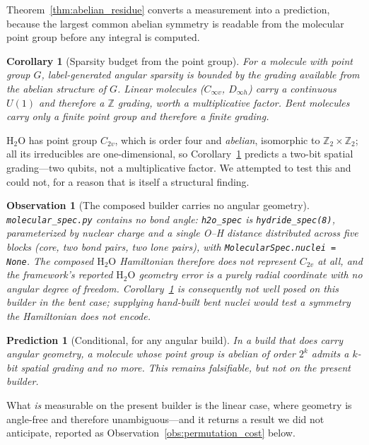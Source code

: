\documentclass[aps,pra,twocolumn,superscriptaddress,longbibliography]{revtex4-2}
\newtheorem{corollary}{Corollary}
\newtheorem{prediction}{Prediction}
\newtheorem{observation}{Observation}
\begin{document}
Theorem~\ref{thm:abelian_residue} converts a measurement into a
prediction, because the largest common abelian symmetry is readable from
the molecular point group before any integral is computed.

\begin{corollary}[Sparsity budget from the point group]
\label{cor:point_group}
For a molecule with point group $G$, label-generated angular sparsity is
bounded by the grading available from the abelian structure of $G$.
Linear molecules ($C_{\infty v}$, $D_{\infty h}$) carry a continuous
$U(1)$ and therefore a $\mathbb{Z}$ grading, worth a multiplicative
factor.  Bent molecules carry only a finite point group and therefore a
finite grading.
\end{corollary}

$\mathrm{H_2O}$ has point group $C_{2v}$, which is order four and
\emph{abelian}, isomorphic to $\mathbb{Z}_2 \times \mathbb{Z}_2$; all its
irreducibles are one-dimensional, so Corollary~\ref{cor:point_group}
predicts a two-bit spatial grading---two qubits, not a multiplicative
factor.  We attempted to test this and could not, for a reason that is
itself a structural finding.

\begin{observation}[The composed builder carries no angular geometry]
\label{obs:no_angle}
\texttt{molecular\_spec.py} contains no bond angle: \texttt{h2o\_spec} is
\texttt{hydride\_spec(8)}, parameterized by nuclear charge and a
\emph{single} O--H distance distributed across five blocks (core, two
bond pairs, two lone pairs), with \texttt{MolecularSpec.nuclei = None}.
The composed $\mathrm{H_2O}$ Hamiltonian therefore does not represent
$C_{2v}$ at all, and the framework's reported $\mathrm{H_2O}$ geometry
error is a purely radial coordinate with no angular degree of freedom.
Corollary~\ref{cor:point_group} is consequently \emph{not well posed} on
this builder in the bent case; supplying hand-built bent nuclei would
test a symmetry the Hamiltonian does not encode.
\end{observation}

\begin{prediction}[Conditional, for any angular build]
\label{pred:angular}
In a build that does carry angular geometry, a molecule whose point group
is abelian of order $2^k$ admits a $k$-bit spatial grading and no more.
This remains falsifiable, but not on the present builder.
\end{prediction}

What \emph{is} measurable on the present builder is the linear case, where
geometry is angle-free and therefore unambiguous---and it returns a result
we did not anticipate, reported as
Observation~\ref{obs:permutation_cost} below.
\end{document}
